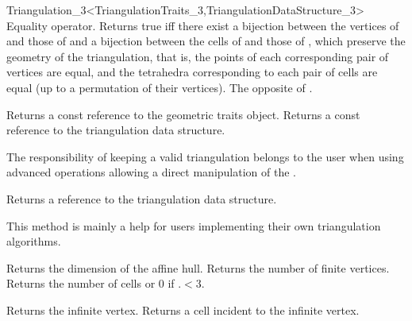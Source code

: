 \begin{ccRefClass}{Triangulation_3<TriangulationTraits_3,TriangulationDataStructure_3>}
{Equality operator.  Returns true iff there exist a bijection between the
vertices of  and those of  and a bijection between the cells of
 and those of , which preserve the geometry of the
triangulation, that is, the points of each corresponding pair of vertices are
equal, and the tetrahedra corresponding to each pair of cells are equal (up to
a permutation of their vertices).}
\ccGlue
{}
{The opposite of .}

\ccAccessFunctions
{}

{Returns a const reference to the geometric traits object.}
\ccGlue
{}
{Returns a const reference to the triangulation data structure.}

\begin{ccAdvanced}
The responsibility of keeping a valid triangulation belongs to the user
when using advanced operations allowing a direct manipulation of the .

{Returns a reference to the triangulation data structure.}

This method is mainly a help for users implementing their own triangulation
algorithms.
 
\end{ccAdvanced}


{Returns the dimension of the affine hull.}
\ccGlue
{}
{Returns the number of finite vertices.}
\ccGlue
{}
{Returns the number of cells or 0 if \ccVar.$<3$.}

{Returns the infinite vertex.}
\ccGlue
{}
{Returns a cell incident to the infinite vertex.}


\end{ccRefClass}
